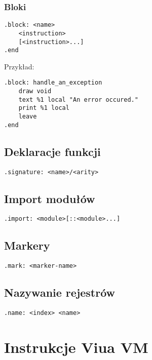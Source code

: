 \subsubsection{Bloki}

\begin{lstlisting}
.block: <name>
	<instruction>
	[<instruction>...]
.end
\end{lstlisting}

Przykład:
\begin{lstlisting}
.block: handle_an_exception
    draw void
    text %1 local "An error occured."
    print %1 local
    leave
.end
\end{lstlisting}

\subsection{Deklaracje funkcji}

\begin{lstlisting}
.signature: <name>/<arity>
\end{lstlisting}

\subsection{Import modułów}
\label{appendix_viua_vm_assembly_language_dir_import}

\begin{lstlisting}
.import: <module>[::<module>...]
\end{lstlisting}

\subsection{Markery}

\begin{lstlisting}
.mark: <marker-name>
\end{lstlisting}

\subsection{Nazywanie rejestrów}

\begin{lstlisting}
.name: <index> <name>
\end{lstlisting}

\newpage
\section{Instrukcje Viua VM}
\label{appendix_viua_vm_assembly_language_ops}

